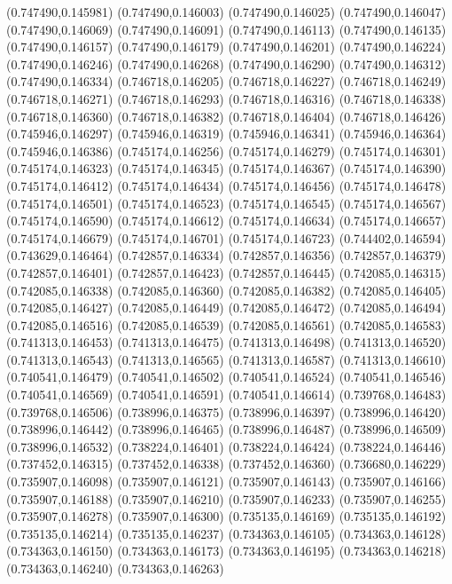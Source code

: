 (0.747490,0.145981)
(0.747490,0.146003)
(0.747490,0.146025)
(0.747490,0.146047)
(0.747490,0.146069)
(0.747490,0.146091)
(0.747490,0.146113)
(0.747490,0.146135)
(0.747490,0.146157)
(0.747490,0.146179)
(0.747490,0.146201)
(0.747490,0.146224)
(0.747490,0.146246)
(0.747490,0.146268)
(0.747490,0.146290)
(0.747490,0.146312)
(0.747490,0.146334)
(0.746718,0.146205)
(0.746718,0.146227)
(0.746718,0.146249)
(0.746718,0.146271)
(0.746718,0.146293)
(0.746718,0.146316)
(0.746718,0.146338)
(0.746718,0.146360)
(0.746718,0.146382)
(0.746718,0.146404)
(0.746718,0.146426)
(0.745946,0.146297)
(0.745946,0.146319)
(0.745946,0.146341)
(0.745946,0.146364)
(0.745946,0.146386)
(0.745174,0.146256)
(0.745174,0.146279)
(0.745174,0.146301)
(0.745174,0.146323)
(0.745174,0.146345)
(0.745174,0.146367)
(0.745174,0.146390)
(0.745174,0.146412)
(0.745174,0.146434)
(0.745174,0.146456)
(0.745174,0.146478)
(0.745174,0.146501)
(0.745174,0.146523)
(0.745174,0.146545)
(0.745174,0.146567)
(0.745174,0.146590)
(0.745174,0.146612)
(0.745174,0.146634)
(0.745174,0.146657)
(0.745174,0.146679)
(0.745174,0.146701)
(0.745174,0.146723)
(0.744402,0.146594)
(0.743629,0.146464)
(0.742857,0.146334)
(0.742857,0.146356)
(0.742857,0.146379)
(0.742857,0.146401)
(0.742857,0.146423)
(0.742857,0.146445)
(0.742085,0.146315)
(0.742085,0.146338)
(0.742085,0.146360)
(0.742085,0.146382)
(0.742085,0.146405)
(0.742085,0.146427)
(0.742085,0.146449)
(0.742085,0.146472)
(0.742085,0.146494)
(0.742085,0.146516)
(0.742085,0.146539)
(0.742085,0.146561)
(0.742085,0.146583)
(0.741313,0.146453)
(0.741313,0.146475)
(0.741313,0.146498)
(0.741313,0.146520)
(0.741313,0.146543)
(0.741313,0.146565)
(0.741313,0.146587)
(0.741313,0.146610)
(0.740541,0.146479)
(0.740541,0.146502)
(0.740541,0.146524)
(0.740541,0.146546)
(0.740541,0.146569)
(0.740541,0.146591)
(0.740541,0.146614)
(0.739768,0.146483)
(0.739768,0.146506)
(0.738996,0.146375)
(0.738996,0.146397)
(0.738996,0.146420)
(0.738996,0.146442)
(0.738996,0.146465)
(0.738996,0.146487)
(0.738996,0.146509)
(0.738996,0.146532)
(0.738224,0.146401)
(0.738224,0.146424)
(0.738224,0.146446)
(0.737452,0.146315)
(0.737452,0.146338)
(0.737452,0.146360)
(0.736680,0.146229)
(0.735907,0.146098)
(0.735907,0.146121)
(0.735907,0.146143)
(0.735907,0.146166)
(0.735907,0.146188)
(0.735907,0.146210)
(0.735907,0.146233)
(0.735907,0.146255)
(0.735907,0.146278)
(0.735907,0.146300)
(0.735135,0.146169)
(0.735135,0.146192)
(0.735135,0.146214)
(0.735135,0.146237)
(0.734363,0.146105)
(0.734363,0.146128)
(0.734363,0.146150)
(0.734363,0.146173)
(0.734363,0.146195)
(0.734363,0.146218)
(0.734363,0.146240)
(0.734363,0.146263)
